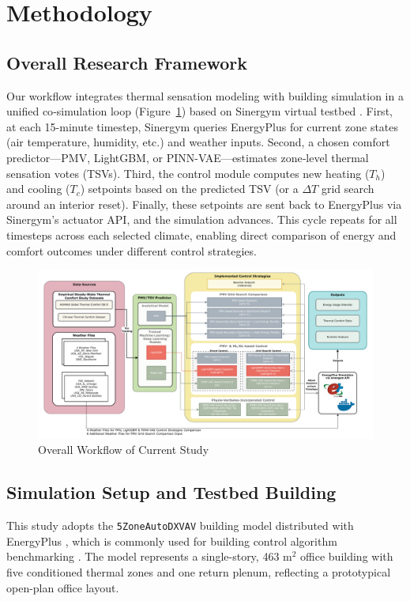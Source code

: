 \section{Methodology}
\subsection{Overall Research Framework}
\label{sec:overall_framework}

Our workflow integrates thermal sensation modeling with building simulation in a unified co‐simulation loop (Figure~\ref{fig:workflow}) based on Sinergym virtual testbed \cite{campoy2025sinergym}. First, at each 15-minute timestep, Sinergym queries EnergyPlus for current zone states (air temperature, humidity, etc.) and weather inputs. Second, a chosen comfort predictor—PMV, LightGBM, or PINN-VAE—estimates zone‐level thermal sensation votes (TSVs). Third, the control module computes new heating ($T_{h}$) and cooling ($T_{c}$) setpoints based on the predicted TSV (or a $\Delta T$ grid search around an interior reset). Finally, these setpoints are sent back to EnergyPlus via Sinergym’s actuator API, and the simulation advances. This cycle repeats for all timesteps across each selected climate, enabling direct comparison of energy and comfort outcomes under different control strategies.

\begin{figure}[h!]
    \centering
    \includegraphics[width=0.95\linewidth]{figs/gridworkflow_3.pdf}
    \caption{Overall Workflow of Current Study}
    \label{fig:workflow}
\end{figure}

\subsection{Simulation Setup and Testbed Building}%
This study adopts the \texttt{5ZoneAutoDXVAV} building model distributed with EnergyPlus \citep{energyplus}, which is commonly used for building control algorithm benchmarking \cite{gao2021deep, an2023clue, kadamala2024enhancing}. The model represents a single-story, 463 m$^2$ office building with five conditioned thermal zones and one return plenum, reflecting a prototypical open-plan office layout.

